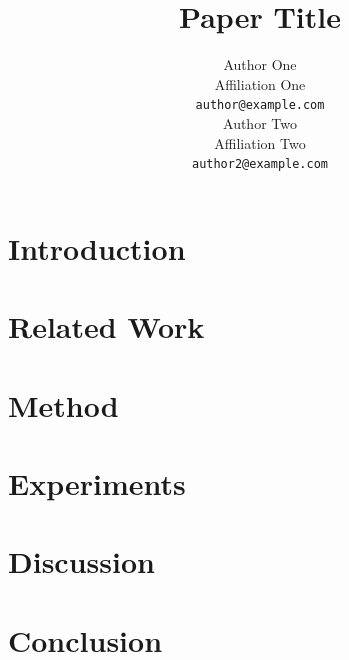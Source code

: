 \documentclass[11pt]{article}
\title{Paper Title}
\author{Author One \\
  Affiliation One \\
  \texttt{author@example.com} \\\And
  Author Two \\
  Affiliation Two \\
  \texttt{author2@example.com}}
\begin{document}
\maketitle

\begin{abstract}
\end{abstract}

\section{Introduction}

\section{Related Work}

\section{Method}

\section{Experiments}

\section{Discussion}

\section{Conclusion}



\end{document}

